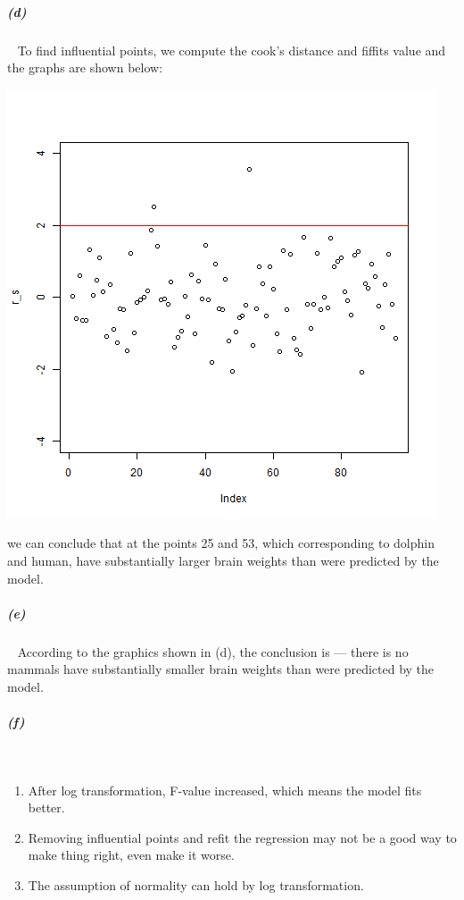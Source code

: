 \documentclass[12pt,a4paper]{article}
\begin{document}
\subparagraph{(d)}~{}
To find influential points, we compute the cook's distance and fiffits value and the graphs are shown below:\\
\begin{center}
\includegraphics[scale=0.6]{3_d.png}
\end{center}
we can conclude that at the points 25 and 53, which corresponding to dolphin and human, have substantially larger brain weights than were predicted by the model.
\subparagraph{(e)}~{}
According to the graphics shown in (d), the conclusion is --- there is no mammals have substantially smaller brain weights than were predicted by the model.
\subparagraph{(f)}~{}
\begin{enumerate}
\item
After log transformation, F-value increased, which means the model fits better.
\item
Removing influential points and refit the regression may not be a good way to make thing right, even make it worse.
\item
The assumption of normality can hold by log transformation.
\end{enumerate}
\end{document}

